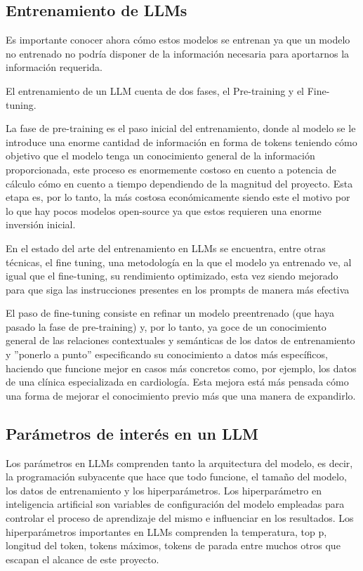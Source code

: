 \subsection{Entrenamiento de LLMs}

Es importante conocer ahora cómo estos modelos se entrenan ya que un modelo no entrenado no podría disponer de la información necesaria para aportarnos la información requerida.

El entrenamiento de un LLM cuenta de dos fases, el Pre-training y el Fine-tuning.

La fase de  pre-training es el paso inicial del entrenamiento, donde al modelo se le introduce una enorme cantidad de información en forma de tokens teniendo cómo objetivo que el modelo tenga un conocimiento general de la información proporcionada, este proceso es enormemente costoso en cuento a potencia de cálculo cómo en cuento a tiempo dependiendo de la magnitud del proyecto. Esta etapa es, por lo tanto, la más costosa económicamente siendo este el motivo por lo que hay pocos modelos open-source ya que estos requieren una enorme inversión inicial.

En el estado del arte del entrenamiento en LLMs se encuentra, entre otras técnicas, el fine tuning, una metodología en la que el modelo ya entrenado ve, al igual que el fine-tuning, su rendimiento optimizado, esta vez siendo mejorado para que siga las instrucciones presentes en los prompts de manera más efectiva

El paso de fine-tuning consiste en refinar un modelo preentrenado (que haya pasado la fase de pre-training) y, por lo tanto, ya goce de un conocimiento general de las relaciones contextuales y semánticas de los datos de entrenamiento y ''ponerlo a punto'' especificando su conocimiento a datos más específicos, haciendo que funcione mejor en casos más concretos como, por ejemplo, los datos de una clínica especializada en cardiología. Esta mejora está más pensada cómo una forma de mejorar el conocimiento previo más que una manera de expandirlo.


\subsection{Parámetros de interés en un LLM}

Los parámetros en LLMs comprenden tanto la arquitectura del modelo, es decir, la programación subyacente que hace que todo funcione, el tamaño del modelo, los datos de entrenamiento y los hiperparámetros.
Los hiperparámetro en inteligencia artificial son variables de configuración del modelo empleadas para controlar el proceso de aprendizaje del mismo e influenciar en los resultados.
Los hiperparámetros importantes en LLMs comprenden la temperatura, top p, longitud del token, tokens máximos, tokens de parada entre muchos otros que escapan el alcance de este proyecto.

